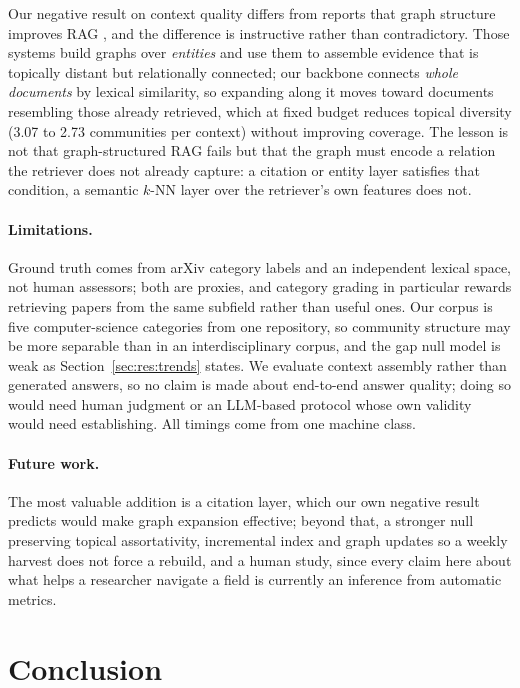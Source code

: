 \documentclass[runningheads]{llncs}
\begin{document}
Our negative result on context quality differs from reports that graph structure improves
RAG \cite{edge2024,gutirrez2024a}, and the difference is instructive rather than
contradictory. Those systems build graphs over \emph{entities} and use them to assemble
evidence that is topically distant but relationally connected; our backbone connects
\emph{whole documents} by lexical similarity, so expanding along it moves toward documents
resembling those already retrieved, which at fixed budget reduces topical diversity (3.07
to 2.73 communities per context) without improving coverage. The lesson is not that
graph-structured RAG fails but that the graph must encode a relation the retriever does
not already capture: a citation or entity layer satisfies that condition, a semantic
$k$-NN layer over the retriever's own features does not.

\paragraph{Limitations.}
Ground truth comes from arXiv category labels and an independent lexical space, not human
assessors; both are proxies, and category grading in particular rewards retrieving papers
from the same subfield rather than useful ones. Our corpus is five computer-science
categories from one repository, so community structure may be more separable than in an
interdisciplinary corpus, and the gap null model is weak as Section~\ref{sec:res:trends}
states. We evaluate context assembly rather than generated answers, so no claim is made
about end-to-end answer quality; doing so would need human judgment or an LLM-based
protocol \cite{es2024} whose own validity would need establishing. All timings come from
one machine class.

\paragraph{Future work.}
The most valuable addition is a citation layer, which our own negative result predicts
would make graph expansion effective; beyond that, a stronger null preserving topical
assortativity, incremental index and graph updates so a weekly harvest does not force a
rebuild, and a human study, since every claim here about what helps a researcher navigate
a field is currently an inference from automatic metrics.

\section{Conclusion}
\label{sec:conclusion}
\end{document}
